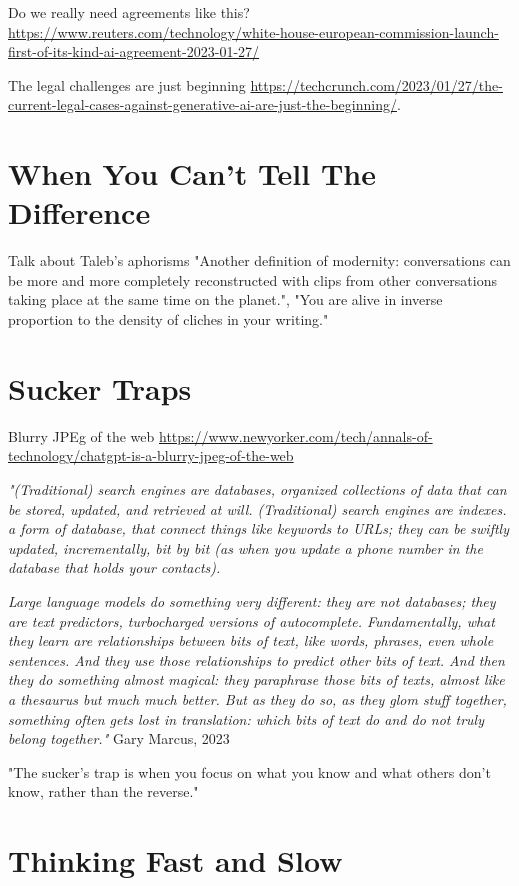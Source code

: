 Do we really need agreements like this? \url{https://www.reuters.com/technology/white-house-european-commission-launch-first-of-its-kind-ai-agreement-2023-01-27/}

The legal challenges are just beginning \url{https://techcrunch.com/2023/01/27/the-current-legal-cases-against-generative-ai-are-just-the-beginning/}.

\section{When You Can't Tell The Difference}

Talk about Taleb's aphorisms "Another definition of modernity: conversations can be more and more completely reconstructed with clips from other conversations taking place at the same time on the planet.", "You are alive in inverse proportion to the density of cliches in your writing."

\section{Sucker Traps}

Blurry JPEg of the web \url{https://www.newyorker.com/tech/annals-of-technology/chatgpt-is-a-blurry-jpeg-of-the-web}

\textit{"(Traditional) search engines are databases, organized collections of data that can be stored, updated, and retrieved at will. (Traditional) search engines are indexes. a form of database, that connect things like keywords to URLs; they can be swiftly updated, incrementally, bit by bit (as when you update a phone number in the database that holds your contacts).}

\textit{Large language models do something very different: they are not databases; they are text predictors, turbocharged versions of autocomplete. Fundamentally, what they learn are relationships between bits of text, like words, phrases, even whole sentences. And they use those relationships to predict other bits of text. And then they do something almost magical: they paraphrase those bits of texts, almost like a thesaurus but much much better. But as they do so, as they glom stuff together, something often gets lost in translation: which bits of text do and do not truly belong together."} Gary Marcus, 2023 \cite{marcus2023}

"The sucker's trap is when you focus on what you know and what others don't know, rather than the reverse."

\section{Thinking Fast and Slow}

